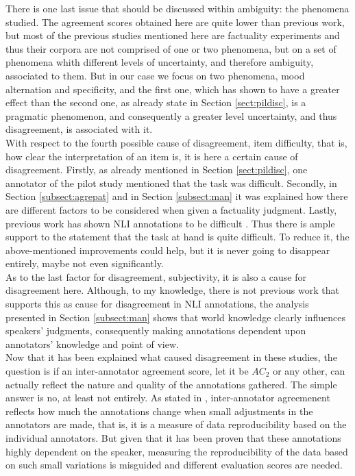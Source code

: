There is one last issue that should be discussed within ambiguity: the phenomena studied. The agreement scores obtained here are quite lower than previous work, but most of the previous studies mentioned here are factuality experiments and thus their corpora are not comprised of one or two phenomena, but on a set of phenomena whith different levels of uncertainty, and therefore ambiguity, associated to them. But in our case we focus on two phenomena, mood alternation and specificity, and the first one, which has shown to have a greater effect than the second one, as already state in Section \ref{sect:pildisc}, is a pragmatic phenomenon, and consequently a greater level uncertainty, and thus disagreement, is associated with it.\\

With respect to the fourth possible cause of disagreement, item difficulty, that is, how clear the interpretation of an item is, it is here a certain cause of disagreement. Firstly, as already mentioned in Section \ref{sect:pildisc}, one annotator of the pilot study mentioned that the task was difficult. Secondly, in Section \ref{subsect:agrepat} and in Section \ref{subsect:man} it was explained how there are different factors to be considered when given a factuality judgment. Lastly, previous work has shown NLI annotations to be difficult \citep{pavlick2019inherent,uma2021learning}. Thus there is ample support to the statement that the task at hand is quite difficult. To reduce it, the above-mentioned improvements could help, but it is never going to disappear entirely, maybe not even significantly.\\

As to the last factor for disagreement, subjectivity, it is also a cause for disagreement here. Although, to my knowledge, there is not previous work that supports this as cause for disagreement in NLI annotations, the analysis presented in Section \ref{subsect:man} shows that world knowledge clearly influences speakers' judgments, consequently making annotations dependent upon annotators' knowledge and point of view.\\

Now that it has been explained what caused disagreement in these studies, the question is if an inter-annotator agreement score, let it be $AC_2$ or any other, can actually reflect the nature and quality of the annotations gathered. The simple answer is no, at least not entirely. As stated in \citet{gwet2014handbook}, inter-annotator agreemenent reflects how much the annotations change when small adjustments in the annotators are made, that is, it is a measure of data reproducibility based on the individual annotators. But given that it has been proven that these annotations highly dependent on the speaker, measuring the reproducibility of the data based on such small variations is misguided and different evaluation scores are needed.\\

